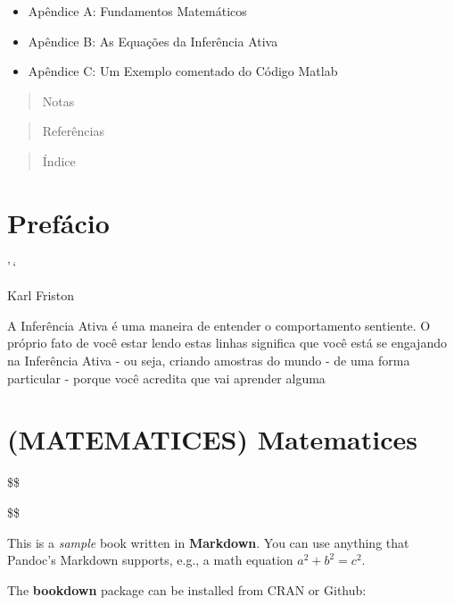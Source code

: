 \documentclass[
]{book}
\providecommand{\tightlist}{%
  \setlength{\itemsep}{0pt}\setlength{\parskip}{0pt}}
\begin{document}
\begin{itemize}
\tightlist
\item
  Apêndice A: Fundamentos Matemáticos
\item
  Apêndice B: As Equações da Inferência Ativa
\item
  Apêndice C: Um Exemplo comentado do Código Matlab
\end{itemize}

\begin{quote}
Notas
\end{quote}

\begin{quote}
Referências
\end{quote}

\begin{quote}
Índice
\end{quote}

\hypertarget{prefuxe1cio}{%
\chapter*{Prefácio}\label{prefuxe1cio}}

'\,`

Karl Friston

A Inferência Ativa é uma maneira de entender o comportamento sentiente. O próprio fato de você estar lendo estas linhas significa que você está se engajando na Inferência Ativa - ou seja, criando amostras do mundo - de uma forma particular - porque você acredita que vai aprender alguma

\cleardoublepage

\hypertarget{matematices-matematices}{%
\chapter*{(MATEMATICES) Matematices}\label{matematices-matematices}}

\$\$

\Leftarrow \Rightarrow \Leftrightarrow
\Longleftarrow \Longrightarrow \Longleftrightarrow
\Uparrow \Downarrow \Updownarrow

\$\$

This is a \emph{sample} book written in \textbf{Markdown}. You can use anything that Pandoc's Markdown supports, e.g., a math equation \(a^2 + b^2 = c^2\).

The \textbf{bookdown} package can be installed from CRAN or Github:
\end{document}
